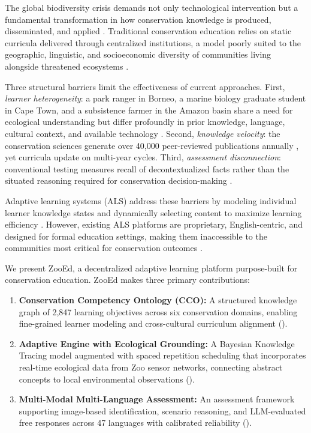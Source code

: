 \documentclass[11pt,a4paper]{article}
\begin{document}
The global biodiversity crisis demands not only technological intervention but a fundamental transformation in how conservation knowledge is produced, disseminated, and applied \citep{diaz2019global}.
Traditional conservation education relies on static curricula delivered through centralized institutions, a model poorly suited to the geographic, linguistic, and socioeconomic diversity of communities living alongside threatened ecosystems \citep{brewer2020conservation}.

Three structural barriers limit the effectiveness of current approaches.
First, \emph{learner heterogeneity}: a park ranger in Borneo, a marine biology graduate student in Cape Town, and a subsistence farmer in the Amazon basin share a need for ecological understanding but differ profoundly in prior knowledge, language, cultural context, and available technology \citep{ardoin2020environmental}.
Second, \emph{knowledge velocity}: the conservation sciences generate over 40,000 peer-reviewed publications annually \citep{fisher2022growth}, yet curricula update on multi-year cycles.
Third, \emph{assessment disconnection}: conventional testing measures recall of decontextualized facts rather than the situated reasoning required for conservation decision-making \citep{stern2014value}.

Adaptive learning systems (ALS) address these barriers by modeling individual learner knowledge states and dynamically selecting content to maximize learning efficiency \citep{vanlehn2011relative}.
However, existing ALS platforms are proprietary, English-centric, and designed for formal education settings, making them inaccessible to the communities most critical for conservation outcomes \citep{kulik2016effectiveness}.

We present ZooEd, a decentralized adaptive learning platform purpose-built for conservation education.
ZooEd makes three primary contributions:

\begin{enumerate}[leftmargin=*]
    \item \textbf{Conservation Competency Ontology (CCO):} A structured knowledge graph of 2,847 learning objectives across six conservation domains, enabling fine-grained learner modeling and cross-cultural curriculum alignment ().
    \item \textbf{Adaptive Engine with Ecological Grounding:} A Bayesian Knowledge Tracing model augmented with spaced repetition scheduling that incorporates real-time ecological data from Zoo sensor networks, connecting abstract concepts to local environmental observations ().
    \item \textbf{Multi-Modal Multi-Language Assessment:} An assessment framework supporting image-based identification, scenario reasoning, and LLM-evaluated free responses across 47 languages with calibrated reliability ().
\end{enumerate}
\end{document}
